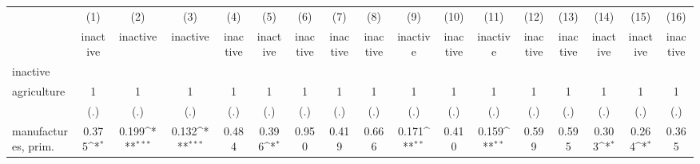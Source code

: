 {
\def\sym#1{\ifmmode^{#1}\else\(^{#1}\)\fi}
\begin{tabular}{l*{16}{c}}
\hline\hline
                    &\multicolumn{1}{c}{(1)}&\multicolumn{1}{c}{(2)}&\multicolumn{1}{c}{(3)}&\multicolumn{1}{c}{(4)}&\multicolumn{1}{c}{(5)}&\multicolumn{1}{c}{(6)}&\multicolumn{1}{c}{(7)}&\multicolumn{1}{c}{(8)}&\multicolumn{1}{c}{(9)}&\multicolumn{1}{c}{(10)}&\multicolumn{1}{c}{(11)}&\multicolumn{1}{c}{(12)}&\multicolumn{1}{c}{(13)}&\multicolumn{1}{c}{(14)}&\multicolumn{1}{c}{(15)}&\multicolumn{1}{c}{(16)}\\
                    &\multicolumn{1}{c}{inactive}&\multicolumn{1}{c}{inactive}&\multicolumn{1}{c}{inactive}&\multicolumn{1}{c}{inactive}&\multicolumn{1}{c}{inactive}&\multicolumn{1}{c}{inactive}&\multicolumn{1}{c}{inactive}&\multicolumn{1}{c}{inactive}&\multicolumn{1}{c}{inactive}&\multicolumn{1}{c}{inactive}&\multicolumn{1}{c}{inactive}&\multicolumn{1}{c}{inactive}&\multicolumn{1}{c}{inactive}&\multicolumn{1}{c}{inactive}&\multicolumn{1}{c}{inactive}&\multicolumn{1}{c}{inactive}\\
\hline
inactive            &                     &                     &                     &                     &                     &                     &                     &                     &                     &                     &                     &                     &                     &                     &                     &                     \\
agriculture         &           1         &           1         &           1         &           1         &           1         &           1         &           1         &           1         &           1         &           1         &           1         &           1         &           1         &           1         &           1         &           1         \\
                    &         (.)         &         (.)         &         (.)         &         (.)         &         (.)         &         (.)         &         (.)         &         (.)         &         (.)         &         (.)         &         (.)         &         (.)         &         (.)         &         (.)         &         (.)         &         (.)         \\
[1em]
manufactures, prim. &       0.375\sym{*}  &       0.199\sym{***}&       0.132\sym{***}&       0.484         &       0.396\sym{*}  &       0.950         &       0.419         &       0.666         &       0.171\sym{**} &       0.410         &       0.159\sym{**} &       0.599         &       0.595         &       0.303\sym{*}  &       0.264\sym{*}  &       0.365         \\

\end{tabular}}

